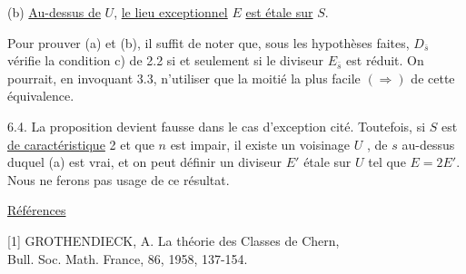 (b) \underline{Au-dessus de} $U$, \underline{le lieu exceptionnel} $E$ \underline{est étale sur} $S$.

Pour prouver (a) et (b), il suffit de noter que, sous les hypothèses faites, $D_{\bar{s}}$ vérifie la condition c) de 2.2 si et seulement si le diviseur $E_{\bar{s}}$ est réduit. On pourrait, en invoquant 3.3, n'utiliser que la moitié la plus facile $(\Longrightarrow)$ de cette équivalence.

6.4. La proposition devient fausse dans le cas d'exception cité. Toutefois, si $S$ est \underline{de caractéristique} 2 et que $n$ est impair, il existe un voisinage $U$ , de $s$ au-dessus duquel (a) est vrai, et on peut définir un diviseur $E'$ étale sur $U$ tel que $E = 2 E'$. Nous ne ferons pas usage de ce résultat.


\underline{Références}

[1] GROTHENDIECK, A. \quad La théorie des Classes de Chern, \\ \hspace*{5.5em} Bull. Soc. Math. France, 86, 1958, 137-154.
